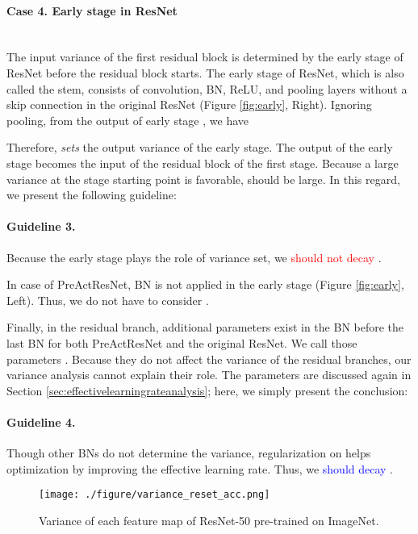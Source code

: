 \documentclass{article}
\begin{document}
\paragraph{Case 4. Early stage in ResNet} \ \\
The input variance of the first residual block is determined by the early stage of ResNet before the residual block starts. The early stage of ResNet, which is also called the stem, consists of convolution, BN, ReLU, and pooling layers without a skip connection in the original ResNet (Figure \ref{fig:early}, Right). Ignoring pooling, from the output of early stage , we have

Therefore,  \emph{sets} the output variance of the early stage. The output of the early stage becomes the input of the residual block of the first stage. Because a large variance at the stage starting point is favorable,  should be large. In this regard, we present the following guideline:
\paragraph{Guideline 3.}Because the early stage plays the role of variance set, we \textcolor{red}{should not decay} .

In case of PreActResNet, BN is not applied in the early stage (Figure \ref{fig:early}, Left). Thus, we do not have to consider .

Finally, in the residual branch, additional  parameters exist in the BN before the last BN for both PreActResNet and the original ResNet. We call those parameters . Because they do not affect the variance of the residual branches, our variance analysis cannot explain their role. The  parameters are discussed again in Section \ref{sec:effectivelearningrateanalysis}; here, we simply present the conclusion:
\paragraph{Guideline 4.}Though other BNs do not determine the variance,  regularization on  helps optimization by improving the effective learning rate. Thus, we \textcolor{blue}{should decay} .

\begin{wrapfigure}{r}{0.26\textwidth}
	\centering
\texttt{[image: ./figure/variance\_reset\_acc.png]}
    \caption{Variance of each feature map of ResNet-50 pre-trained on ImageNet.}
    \label{fig:variance}
\end{wrapfigure}
\end{document}
